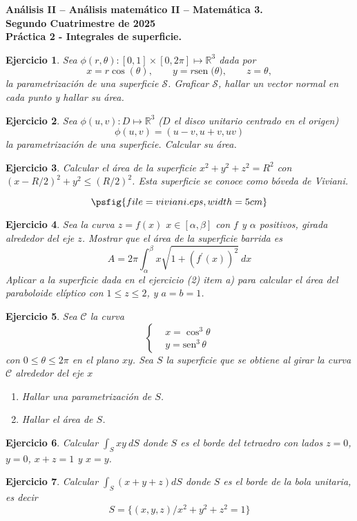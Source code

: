 \documentclass[11pt,a4paper]{amsart}
\newtheorem{ej}{Ejercicio}
\newcommand{\bej}[1]{\begin{ej}\rm{#1}}
\newcommand{\eej}{\end{ej}\vspace{-0.2cm}}
\renewcommand{\bf}{\textbf}
\newcommand{\Su}{\mathcal{S}}
\newcommand{\R}{\mathbb{R}}
\newcommand{\0}{\mathbb{O}}
\newcommand{\8}{\infty}
\newcommand{\sen}[1]{\mbox{sen}\;{#1}}
\begin{document}
\begin{center}
\bf{\Large Análisis II -- Análisis matemático II -- Matemática 3.} \\
\bigskip
\bf{\large Segundo Cuatrimestre de 2025}\\
\bigskip
\bf{Práctica 2 - Integrales de superficie.}
\end{center}


\bej  Sea $\phi (r,\theta ):[0,1]\times [0,2\pi ]\mapsto \R^3$ dada
por
\[
x=r\cos(\theta ), \qquad y=r\sen(\theta ), \qquad z=\theta,
\]
la parametrización de una superficie $\Su$. Graficar $\Su$, hallar un vector normal en cada punto y hallar su
área. \eej

\bej  Sea $\phi (u,v):D\mapsto \R^3$ ($D$ el disco unitario centrado en el 
origen)
\[
\phi (u,v)=(u-v,u+v,uv)
\]
la parametrización de una superficie. Calcular su área.
\eej

\bej  Calcular el área de la superficie $x^2+y^2+z^2=R^2$ con $%
(x-R/2)^2+y^2\le (R/2)^2$. Esta superficie se conoce como \emph {bóveda de Viviani}.

\[
\psfig{file=viviani.eps,width=5cm}
\]

\eej

\bej  Sea la curva $z=f(x)$ $x\in [\alpha ,\beta ]$ con $f$ y $\alpha $
positivos, girada alrededor del eje $z$. Mostrar que el área de la
superficie barrida es
\[
A=2\pi \int_\alpha ^\beta x\sqrt{1+(f^{\prime }(x))^2}\ dx
\]
Aplicar a la superficie dada en el ejercicio (2) item a) para calcular el
área del paraboloide elíptico con $1\le z\le 2$, y $a=b=1$.
\eej

\bej Sea $\mathcal C$ la curva
\[
\left\{
\begin{aligned}
&x=\cos^3\theta\\
&y=\mbox{sen}^3\,\theta
\end{aligned}\right.
\]
con $0\le\theta\le 2\pi$
en el plano
$xy$. Sea $S$ la superficie que se obtiene al girar la curva $\mathcal C$
 alrededor del eje $x$
\begin{enumerate}
\item[a).] Hallar una parametrización de $S$.
\item[b).] Hallar el área de $S$.
\end{enumerate}
\eej

\bej  Calcular $\int_Sxy\ dS$ donde $S$ es el borde del tetraedro con lados
$z=0$, $y=0$, $x+z=1$ y $x=y$.
\eej

\bej  Calcular $\int_S(x+y+z)dS$ donde $S$ es el borde de la bola unitaria,
es decir
\[
S=\{(x,y,z)/x^2+y^2+z^2=1\}
\]
\eej
\end{document}
